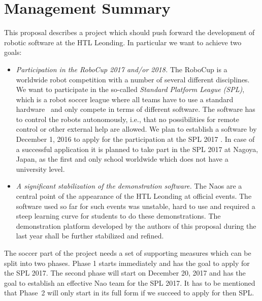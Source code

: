 \documentclass[12pt]{article}
\theoremstyle{definition}
\begin{document}
\setcounter{tocdepth}{2}
\tableofcontents
\pagebreak

\section{Management Summary}\label{sec:managementsummary}
This proposal describes a project which should push forward the development of robotic software at the HTL Leonding. In particular we want to achieve two goals:

\begin{itemize}
	\item {\em Participation in the RoboCup 2017 and/or 2018.} The RoboCup is a worldwide robot competition with a number of several different disciplines. We want to participate in the so-called {\em Standard Platform League (SPL)}, which is a robot soccer league where all teams have to use a standard hardware~\cite{softbank_robotics_who_2016} and only compete in terms of different software. The software has to control the robots autonomously, i.e., that no possibilities for remote control or other external help are allowed. We plan to establish a software by December 1, 2016 to apply for the participation at the SPL 2017 . In case of a successful application it is planned to take part in the SPL 2017 at Nagoya, Japan, as the first and only school worldwide which does not have a university level.
	
	\item {\em A significant stabilization of the demonstration software.} The Naos are a central point of the appearance of the HTL Leonding at official events. The software used so far for such events was unstable, hard to use and required a steep learning curve for students to do these demonstrations. The demonstration platform developed by the authors of this proposal during the last year shall be further stabilized and refined.
\end{itemize}

The soccer part of the project needs a set of supporting measures which can be split into two phases. Phase 1 starts immediately and has the goal to apply for the SPL 2017. The second phase will start on December 20, 2017 and has the goal to establish an effective Nao team for the SPL 2017. It has to be mentioned that Phase~2 will only start in its full form if we succeed to apply for then SPL.
\end{document}
